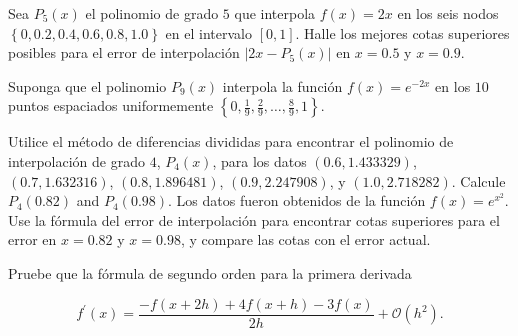 \begin{questions}
    \question

    Sea $P_{5}\left(x\right)$ el polinomio de grado $5$ que
    interpola $f\left(x\right)=2x$ en los seis nodos
    $\left\{0, 0.2, 0.4, 0.6, 0.8, 1.0\right\}$ en el intervalo $\left[0,1\right]$.
    Halle los mejores cotas superiores posibles para el error de interpolación
    $\left|2x-P_{5}\left(x\right)\right|$ en $x=0.5$ y $x=0.9$.

    \question

    Suponga que el polinomio $P_{9}\left(x\right)$ interpola la función $f\left(x\right)=e^{-2x}$
    en los $10$ puntos espaciados uniformemente $\left\{0,\frac{1}{9},\frac{2}{9},\dotsc,\frac{8}{9},1\right\}$.

    \question

    Utilice el método de diferencias divididas para encontrar el polinomio de interpolación de grado $4$, $P_{4}\left(x\right)$,
    para los datos $\left(0.6, 1.433329\right)$, $\left(0.7,1.632316\right)$,
    $\left(0.8, 1.896481\right)$, $\left(0.9, 2.247908\right)$, y $\left(1.0, 2.718282\right)$.
    Calcule $P_{4}(0.82)$ and $P_{4}\left(0.98\right)$.
    Los datos fueron obtenidos de la función $f\left(x\right)=e^{x^2}$.
    Use la fórmula del error de interpolación para encontrar cotas superiores para el error en $x=0.82$
    y $x=0.98$, y compare las cotas con el error actual.

    \question

    Pruebe que la fórmula de segundo orden para la primera derivada

    \begin{equation*}
        f^{\prime}\left(x\right)=
        \frac{-f\left(x+2h\right)+4f\left(x+h\right)-3f\left(x\right)}{2h}+
        \mathcal{O}\left(h^{2}\right).
    \end{equation*}


\end{questions}
